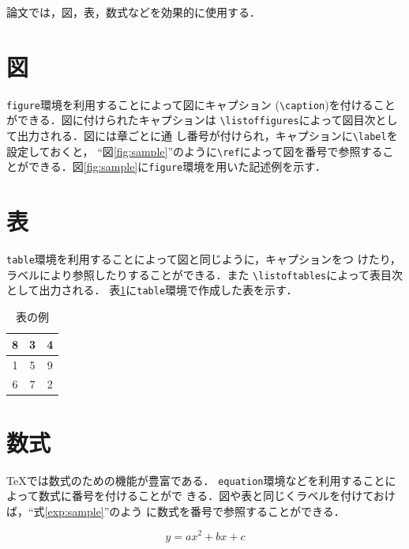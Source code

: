 \documentclass[11pt]{jreport}
\begin{document}
論文では，図，表，数式などを効果的に使用する．

\section{図}

{\tt figure}環境を利用することによって図にキャプション
(\verb|\caption|)を付けることができる．図に付けられたキャプションは
\verb|\listoffigures|によって図目次として出力される．図には章ごとに通
し番号が付けられ，キャプションに\verb|\label|を設定しておくと，
``図\ref{fig:sample}''のように\verb|\ref|によって図を番号で参照するこ
とができる．図\ref{fig:sample}に{\tt figure}環境を用いた記述例を示す．











\section{表}

{\tt table}環境を利用することによって図と同じように，キャプションをつ
けたり，ラベルにより参照したりすることができる．また
\verb|\listoftables|によって表目次として出力される．
表\ref{tab:sample}に{\tt table}環境で作成した表を示す．

\begin{table}
  \caption{表の例}
  \label{tab:sample}
  \begin{center}
    \begin{tabular}{|c|c|c|}
      \hline
      8 & 3 & 4\\
      \hline
      1 & 5 & 9 \\
      \hline
      6 & 7 & 2 \\
      \hline
    \end{tabular}
  \end{center}
\end{table}

\section{数式}

\TeX では数式のための機能が豊富である．
{\tt equation}環境などを利用することによって数式に番号を付けることがで
きる．図や表と同じくラベルを付けておけば，``式\ref{exp:sample}''のよう
に数式を番号で参照することができる．

\begin{equation}
  y = ax^2 + bx + c \label{exp:sample}
\end{equation}
\end{document}
